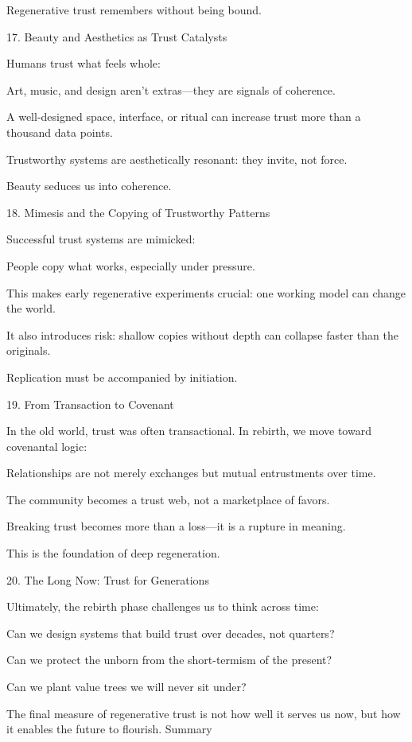 \documentclass[11pt,oneside]{book}
\begin{document}
Regenerative trust remembers without being bound.

17. Beauty and Aesthetics as Trust Catalysts


Humans trust what feels whole:

    Art, music, and design aren’t extras—they are signals of coherence.

    A well-designed space, interface, or ritual can increase trust more than a thousand data points.

    Trustworthy systems are aesthetically resonant: they invite, not force.

Beauty seduces us into coherence.

18. Mimesis and the Copying of Trustworthy Patterns


Successful trust systems are mimicked:

    People copy what works, especially under pressure.

    This makes early regenerative experiments crucial: one working model can change the world.

    It also introduces risk: shallow copies without depth can collapse faster than the originals.

Replication must be accompanied by initiation.

19. From Transaction to Covenant


In the old world, trust was often transactional. In rebirth, we move toward covenantal logic:

    Relationships are not merely exchanges but mutual entrustments over time.

    The community becomes a trust web, not a marketplace of favors.

    Breaking trust becomes more than a loss—it is a rupture in meaning.

This is the foundation of deep regeneration.

20. The Long Now: Trust for Generations


Ultimately, the rebirth phase challenges us to think across time:

    Can we design systems that build trust over decades, not quarters?

    Can we protect the unborn from the short-termism of the present?

    Can we plant value trees we will never sit under?

The final measure of regenerative trust is not how well it serves us now, but how it enables the future to flourish.
Summary
\end{document}

